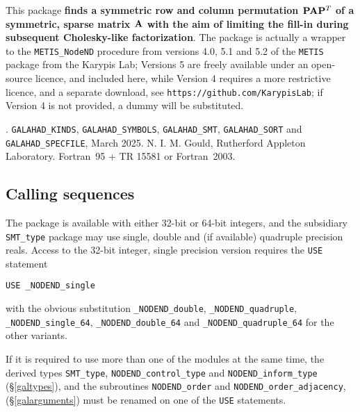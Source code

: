 \documentclass{galahad}
\newcommand{\packagename}{NODEND}
\newcommand{\fullpackagename}{\libraryname\_\-\packagename}
\begin{document}
\galheader


\galsummary

This package
{\bf finds a symmetric row and column permutation ${\mathbf{P}} {\mathbf{A}} {\mathbf{P}}^T$ 
of a symmetric, sparse matrix ${\mathbf{A}}$ with the aim of limiting 
the fill-in during subsequent Cholesky-like factorization}. 
The package is actually a wrapper to the {\tt METIS\_NodeND} 
procedure from versions 4.0, 5.1 and 5.2 of the
{\tt METIS} package from the Karypis Lab; Versions 5 are freely 
available under an open-source licence, and included here, 
while Version 4 requires a more restrictive licence, and a separate download, 
see {\tt https://github.com/KarypisLab}; if Version 4 is not provided,
a dummy will be substituted.


\galattributes
\galversions{\tt  \fullpackagename\_single, \fullpackagename\_double}.
\galcalls
{\tt GALAHAD\-\_KINDS},
{\tt GAL\-AHAD\-\_SYMBOLS},
{\tt GALAHAD\_SMT},
{\tt GALAHAD\_\-SORT}
and 
{\tt GALAHAD\_SPECFILE},
\galdate March 2025.
\galorigin N. I. M. Gould, Rutherford Appleton Laboratory.
\gallanguage Fortran~95 + TR 15581 or Fortran~2003.


\galhowto

\subsection{Calling sequences}

The package is available with either 32-bit or 64-bit integers, 
and the subsidiary {\tt SMT\_type} package may use
single, double and (if available) quadruple precision reals.
Access to the 32-bit integer,
single precision version requires the {\tt USE} statement
\medskip

\hspace{8mm} {\tt USE \fullpackagename\_single}

\medskip
\noindent
with the obvious substitution 
{\tt \fullpackagename\_double},
{\tt \fullpackagename\_quadruple},
{\tt \fullpackagename\_single\_64},
{\tt \fullpackagename\_double\_64} and
{\tt \fullpackagename\_quadruple\_64} for the other variants.

\noindent
If it is required to use more than one of the modules at the same time, 
the derived types
{\tt SMT\_type},
{\tt \packagename\_control\_type}
and
{\tt \packagename\_inform\_type}
(\S\ref{galtypes}),
and the subroutines
{\tt \packagename\-\_order}
and
{\tt \packagename\-\_order\_adjacency},
(\S\ref{galarguments})
must be renamed on one of the {\tt USE} statements.
\end{document}
